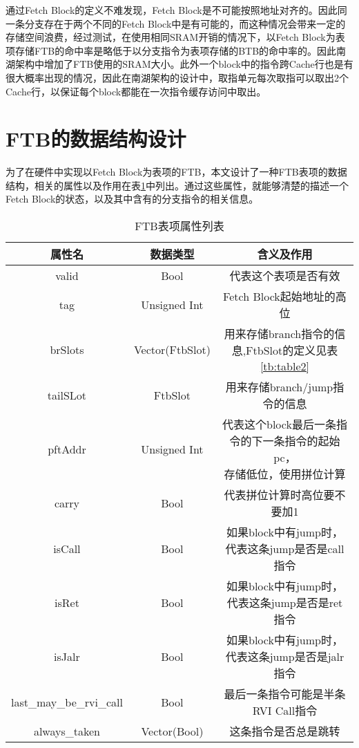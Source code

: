 通过Fetch Block的定义不难发现，Fetch Block是不可能按照地址对齐的。因此同一条分支存在于两个不同的Fetch Block中是有可能的，而这种情况会带来一定的存储空间浪费，经过测试，在使用相同SRAM开销的情况下，以Fetch Block为表项存储FTB的命中率是略低于以分支指令为表项存储的BTB的命中率的。因此南湖架构中增加了FTB使用的SRAM大小。此外一个block中的指令跨Cache行也是有很大概率出现的情况，因此在南湖架构的设计中，取指单元每次取指可以取出2个Cache行，以保证每个block都能在一次指令缓存访问中取出。

\section{FTB的数据结构设计}


为了在硬件中实现以Fetch Block为表项的FTB，本文设计了一种FTB表项的数据结构，相关的属性以及作用在表\ref{tb:table1}中列出。通过这些属性，就能够清楚的描述一个Fetch Block的状态，以及其中含有的分支指令的相关信息。

\begin{table}[]
	\caption{FTB表项属性列表}
	\label{tb:table1}
	\centering
	\begin{tabular}{|c|c|c|}
		\hline
		属性名   & 数据类型   & 含义及作用   \\ \hline
		valid & Bool & 代表这个表项是否有效 \\ \hline
		tag & Unsigned Int & Fetch Block起始地址的高位 \\ \hline
		brSlots & Vector(FtbSlot) & 用来存储branch指令的信息,FtbSlot的定义见表\ref{tb:table2} \\ \hline
		tailSLot & FtbSlot & 用来存储branch/jump指令的信息 \\ \hline
		pftAddr & Unsigned Int & \tabincell{c}{代表这个block最后一条指令的下一条指令的起始pc， \\ 存储低位，使用拼位计算} \\ \hline
		carry & Bool & 代表拼位计算时高位要不要加1 \\ \hline
		isCall & Bool & 如果block中有jump时，代表这条jump是否是call指令 \\ \hline
		isRet & Bool & 如果block中有jump时，代表这条jump是否是ret指令 \\ \hline
		isJalr & Bool & 如果block中有jump时，代表这条jump是否是jalr指令 \\ \hline
		last\_may\_be\_rvi\_call & Bool & 最后一条指令可能是半条RVI Call指令 \\ \hline
		always\_taken & Vector(Bool) & 这条指令是否总是跳转 \\ \hline
	\end{tabular}
\end{table}

